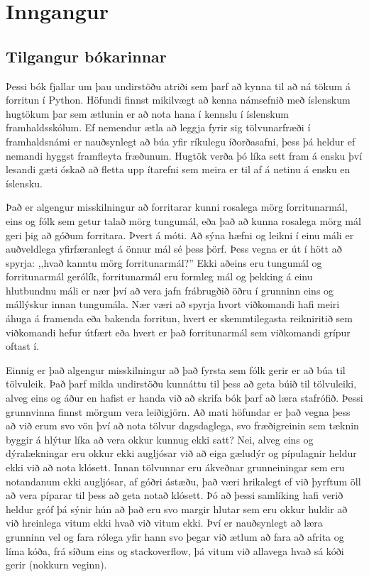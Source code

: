


\chapter{Inngangur}

\section{Tilgangur bókarinnar}

Þessi bók fjallar um þau undirstöðu atriði sem þarf að kynna til að ná tökum á forritun í Python. 
Höfundi finnst mikilvægt að kenna námsefnið með íslenskum hugtökum þar sem ætlunin er að nota hana í kennslu í íslenskum framhaldsskólum. 
Ef nemendur ætla að leggja fyrir sig tölvunarfræði í framhaldsnámi er nauðsynlegt að búa yfir ríkulegu íðorðasafni, þess þá heldur ef nemandi hyggst framfleyta fræðunum. 
Hugtök verða þó líka sett fram á ensku því lesandi gæti óskað að fletta upp ítarefni sem meira er til af á netinu á ensku en íslensku.

Það er algengur misskilningur að forritarar kunni rosalega mörg forritunarmál, eins og fólk sem getur talað mörg tungumál, eða það að kunna rosalega mörg mál geri þig að góðum forritara.
Þvert á móti.
Að sýna hæfni og leikni í einu máli er auðveldlega yfirfæranlegt á önnur mál sé þess þörf.
Þess vegna er út í hött að spyrja: ,,hvað kanntu mörg forritunarmál?''
Ekki aðeins eru tungumál og forritunarmál gerólík, forritunarmál eru formleg mál og þekking á einu hlutbundnu máli er nær því að vera jafn frábrugðið öðru í grunninn eins og mállýskur innan tungumála.
Nær væri að spyrja hvort viðkomandi hafi meiri áhuga á framenda eða bakenda forritun, hvert er skemmtilegasta reikniritið sem viðkomandi hefur útfært eða hvert er það forritunarmál sem viðkomandi grípur oftast í.

Einnig er það algengur misskilningur að það fyrsta sem fólk gerir er að búa til tölvuleik.
Það þarf mikla undirstöðu kunnáttu til þess að geta búið til tölvuleiki, alveg eins og áður en hafist er handa við að skrifa bók þarf að læra stafrófið.
Þessi grunnvinna finnst mörgum vera leiðigjörn.
Að mati höfundar er það vegna þess að við erum svo vön því að nota tölvur dagsdaglega, svo fræðigreinin sem tæknin byggir á hlýtur líka að vera okkur kunnug ekki satt?
Nei, alveg eins og dýralækningar eru okkur ekki augljósar við að eiga gæludýr og pípulagnir heldur ekki við að nota klósett.
Innan tölvunnar eru ákveðnar grunneiningar sem eru notandanum ekki augljósar, af góðri ástæðu, það væri hrikalegt ef við þyrftum öll að vera píparar til þess að geta notað klósett.
Þó að þessi samlíking hafi verið heldur gróf þá sýnir hún að það eru svo margir hlutar sem eru okkur huldir að við hreinlega vitum ekki hvað við vitum ekki.
Því er nauðsynlegt að læra grunninn vel og fara rólega yfir hann svo þegar við ætlum að fara að afrita og líma kóða, frá síðum eins og stackoverflow, þá vitum við allavega hvað sá kóði gerir (nokkurn veginn).

